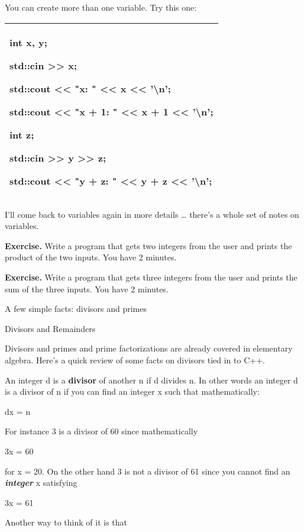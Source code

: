 \documentclass[
]{article}
\begin{document}
You can create more than one variable. Try this one:

\begin{longtable}[]{@{}l@{}}
\toprule
\endhead
\begin{minipage}[t]{0.97\columnwidth}\raggedright
int x, y;

std::cin \textgreater\textgreater{} x;

std::cout \textless\textless{} "x: " \textless\textless{} x
\textless\textless{} '\textbackslash n';

std::cout \textless\textless{} "x + 1: " \textless\textless{} x + 1
\textless\textless{} '\textbackslash n';

int z;

std::cin \textgreater\textgreater{} y \textgreater\textgreater{} z;

std::cout \textless\textless{} "y + z: " \textless\textless{} y + z
\textless\textless{} '\textbackslash n';\strut
\end{minipage}\tabularnewline
\bottomrule
\end{longtable}

I'll come back to variables again in more details \ldots{} there's a
whole set of notes on variables.

\textbf{Exercise.} Write a program that gets two integers from the user
and prints the product of the two inputs. You have 2 minutes.

\textbf{Exercise.} Write a program that gets three integers from the
user and prints the sum of the three inputs. You have 2 minutes.

A few simple facts: divisors and primes

Divisors and Remainders

Divisors and primes and prime factorizations are already covered in
elementary algebra. Here's a quick review of some facts on divisors tied
in to C++.

An integer d is a \textbf{divisor} of another n if d divides n. In other
words an integer d is a divisor of n if you can find an integer x such
that mathematically:

dx = n

For instance 3 is a divisor of 60 since mathematically

3x = 60

for x = 20. On the other hand 3 is not a divisor of 61 since you cannot
find an \emph{\textbf{integer}} x satisfying

3x = 61

Another way to think of it is that
\end{document}
